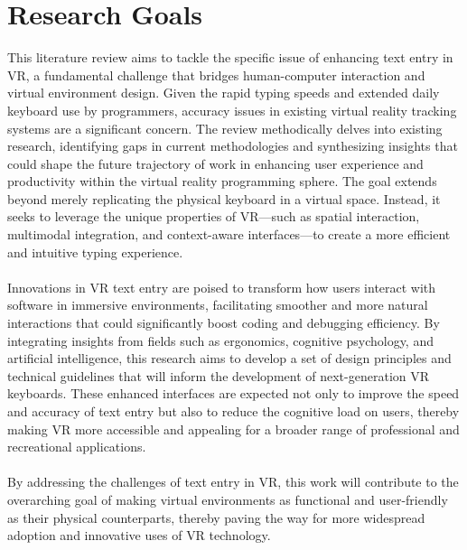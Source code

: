 \section{Research Goals}
\label{sec: Research Goals} 
This literature review aims to tackle the specific issue of enhancing text entry in \ac{VR}, a fundamental challenge that bridges human-computer interaction and virtual environment design. Given the rapid typing speeds and extended daily keyboard use by programmers, accuracy issues in existing virtual reality tracking systems are a significant concern. The review methodically delves into existing research, identifying gaps in current methodologies and synthesizing insights that could shape the future trajectory of work in enhancing user experience and productivity within the virtual reality programming sphere. The goal extends beyond merely replicating the physical keyboard in a virtual space. Instead, it seeks to leverage the unique properties of \ac{VR}—such as spatial interaction, multimodal integration, and context-aware interfaces—to create a more efficient and intuitive typing experience. \\ \\
Innovations in \ac{VR} text entry are poised to transform how users interact with software in immersive environments, facilitating smoother and more natural interactions that could significantly boost coding and debugging efficiency. By integrating insights from fields such as ergonomics, cognitive psychology, and artificial intelligence, this research aims to develop a set of design principles and technical guidelines that will inform the development of next-generation \ac{VR} keyboards. These enhanced interfaces are expected not only to improve the speed and accuracy of text entry but also to reduce the cognitive load on users, thereby making \ac{VR} more accessible and appealing for a broader range of professional and recreational applications.\\ \\
By addressing the challenges of text entry in \ac{VR}, this work will contribute to the overarching goal of making virtual environments as functional and user-friendly as their physical counterparts, thereby paving the way for more widespread adoption and innovative uses of \ac{VR} technology.
